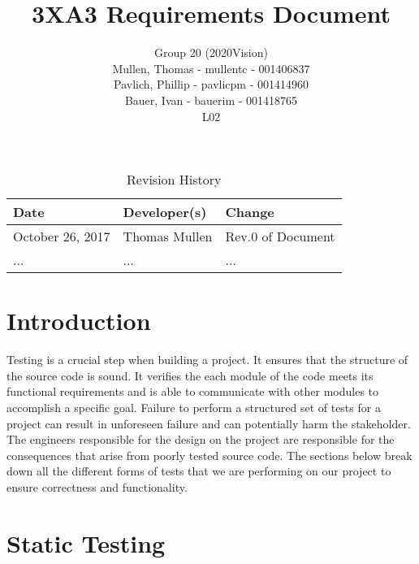 \documentclass[12pt]{article}
\title{3XA3 Requirements Document}
\author{Group 20 (2020Vision)\\
Mullen, Thomas - mullentc - 001406837\\
Pavlich, Phillip - pavlicpm - 001414960\\
Bauer, Ivan - bauerim - 001418765\\
L02}
\date{}
\begin{document}
\begin{table}[hp]
\caption{Revision History} \label{TblRevisionHistory}
\begin{tabularx}{\textwidth}{XXl}
\toprule
\textbf{Date} & \textbf{Developer(s)} & \textbf{Change}\\
\midrule
October 26, 2017 & Thomas Mullen & Rev.0 of Document\\
... & ... & ...\\
\bottomrule
\end{tabularx}
\end{table}
\newpage

\maketitle
\newpage

\section{Introduction}
Testing is a crucial step when building a project. It ensures that the structure of the source code is sound. It verifies the each module of the code meets its functional requirements and is able to communicate with other modules to accomplish a specific goal. Failure to perform a structured set of tests for a project can result in unforeseen failure and can potentially harm the stakeholder. The engineers responsible for the design on the project are responsible for the consequences that arise from poorly tested source code. The sections below break down all the different forms of tests that we are performing on our project to ensure correctness and functionality. 

\section{Static Testing}
\end{document}
